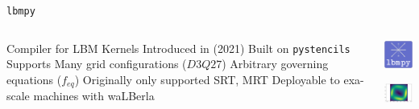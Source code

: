 \begin{frame}{\lstinline{lbmpy}}
  \begin{columns}
  \begin{outline}
  \1 Compiler for LBM Kernels
  \2 Introduced in \cite{Bauer2021lbmpy} (2021)
  \2 Built on \lstinline{pystencils}
  \1 Supports
  \2 Many grid configurations ($D3Q27$)
  \2 Arbitrary governing equations ($f_{eq}$)
  \1 Originally only supported SRT, MRT
  \1 Deployable to exa-scale machines with waLBerla
  \end{outline}

  \centering
  \begin{center}
    \includegraphics[width=2cm]{lbmpy_logo.png}

    \vspace{1cm}

    \includegraphics[width=3cm]{thermal_flow.png}
  \end{center}
\end{columns}
\end{frame}
